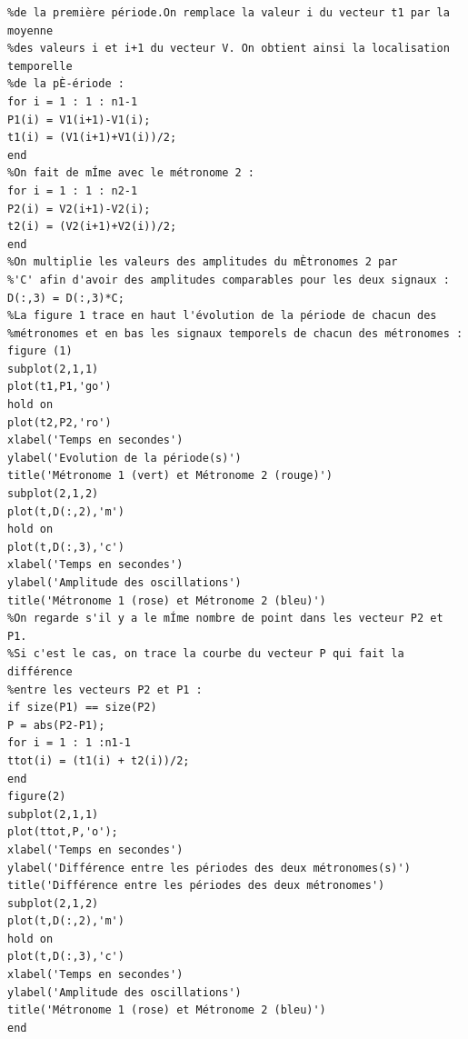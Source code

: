 \documentclass[a4paper,11pt]{report}
\begin{document}
\begin{verbatim}
%de la première période.On remplace la valeur i du vecteur t1 par la moyenne
%des valeurs i et i+1 du vecteur V. On obtient ainsi la localisation temporelle
%de la pÈ-ériode :
for i = 1 : 1 : n1-1
P1(i) = V1(i+1)-V1(i);
t1(i) = (V1(i+1)+V1(i))/2;
end
%On fait de mÍme avec le métronome 2 :
for i = 1 : 1 : n2-1
P2(i) = V2(i+1)-V2(i);
t2(i) = (V2(i+1)+V2(i))/2;
end
%On multiplie les valeurs des amplitudes du mÈtronomes 2 par
%'C' afin d'avoir des amplitudes comparables pour les deux signaux :
D(:,3) = D(:,3)*C;
%La figure 1 trace en haut l'évolution de la période de chacun des
%métronomes et en bas les signaux temporels de chacun des métronomes :
figure (1)
subplot(2,1,1)
plot(t1,P1,'go')
hold on
plot(t2,P2,'ro')
xlabel('Temps en secondes')
ylabel('Evolution de la période(s)')
title('Métronome 1 (vert) et Métronome 2 (rouge)')
subplot(2,1,2)
plot(t,D(:,2),'m')
hold on
plot(t,D(:,3),'c')
xlabel('Temps en secondes')
ylabel('Amplitude des oscillations')
title('Métronome 1 (rose) et Métronome 2 (bleu)')
%On regarde s'il y a le mÍme nombre de point dans les vecteur P2 et P1.
%Si c'est le cas, on trace la courbe du vecteur P qui fait la différence
%entre les vecteurs P2 et P1 :
if size(P1) == size(P2)
P = abs(P2-P1);
for i = 1 : 1 :n1-1
ttot(i) = (t1(i) + t2(i))/2;
end
figure(2)
subplot(2,1,1)
plot(ttot,P,'o');
xlabel('Temps en secondes')
ylabel('Différence entre les périodes des deux métronomes(s)')
title('Différence entre les périodes des deux métronomes')
subplot(2,1,2)
plot(t,D(:,2),'m')
hold on
plot(t,D(:,3),'c')
xlabel('Temps en secondes')
ylabel('Amplitude des oscillations')
title('Métronome 1 (rose) et Métronome 2 (bleu)')
end
\end{verbatim}
\end{document}
